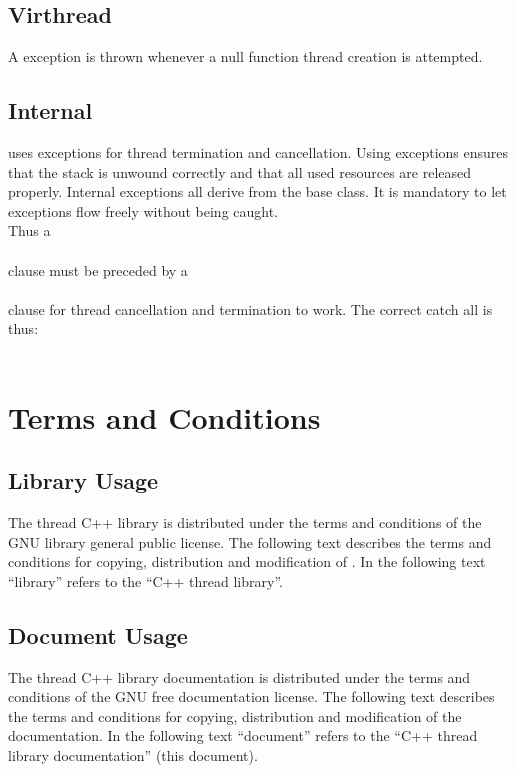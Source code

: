 \section{Virthread}
\label{sec:Exceptions.Virthread}
A  exception is thrown whenever a null function thread creation is attempted.

\section{Internal}
\label{sec:Exceptions.Internal}
\lisle uses exceptions for thread termination and cancellation.
Using exceptions ensures that the stack is unwound correctly and that all used resources are released properly.
Internal exceptions all derive from the  base class.
It is mandatory to let  exceptions flow freely without being caught.
\\
Thus a
\\
\indent {}
\\
clause must be preceded by a
\\
\indent {}
\\
clause for thread cancellation and termination to work.
The correct catch all is thus:
\\
\indent {}
\\
\indent {}

\appendix

\newpage
\chapter{Terms and Conditions}
\label{app:Terms}

\section{Library Usage}
\label{app:LGPL}
The \lisle thread C++ library is distributed under the terms and
conditions of the GNU library general public license. The following
text describes the terms and conditions for copying, distribution and
modification of \lisle. In the following text ``library'' refers to
the ``\lisle C++ thread library''.
\vspace*{5ex}


\newpage
\section{Document Usage}
\label{app:FDL}
The \lisle thread C++ library documentation is distributed under the
terms and conditions of the GNU free documentation license. The
following text describes the terms and conditions for copying,
distribution and modification of the \lisle documentation. In the
following text ``document'' refers to the ``\lisle C++ thread library
documentation'' (this document).






